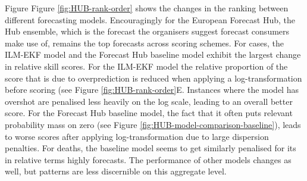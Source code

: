 \documentclass{article}
\begin{document}
Figure Figure \ref{fig:HUB-rank-order} shows the changes in the ranking between different forecasting models. Encouragingly for the European Forecast Hub, the Hub ensemble, which is the forecast the organisers suggest forecast consumers make use of, remains the top forecasts across scoring schemes. For cases, the ILM-EKF model and the Forecast Hub baseline model exhibit the largest change in relative skill scores. For the ILM-EKF model the relative proportion of the score that is due to overprediction is reduced when applying a log-transformation before scoring (see Figure \ref{fig:HUB-rank-order}E. Instances where the model has overshot are penalised less heavily on the log scale, leading to an overall better score. For the Forecast Hub baseline model, the fact that it often puts relevant probability mass on zero (see Figure \ref{fig:HUB-model-comparison-baseline}), leads to worse scores after applying log-transformation due to large dispersion penalties. For deaths, the baseline model seems to get similarly penalised for its in relative terms highly forecasts. The performance of other models changes as well, but patterns are less discernible on this aggregate level. 



\end{document}
